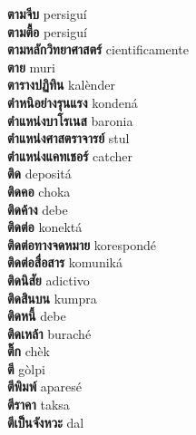 \textbf{ ตามจีบ  } persiguí \\
\textbf{ ตามตื้อ  } persiguí \\
\textbf{ ตามหลักวิทยาศาสตร์  } cientificamente \\
\textbf{ ตาย  } muri \\
\textbf{ ตารางปฏิทิน  } kalènder \\
\textbf{ ตำหนิอย่างรุนแรง  } kondená \\
\textbf{ ตำแหน่งบาโรเนส  } baronia \\
\textbf{ ตำแหน่งศาสตราจารย์  } stul \\
\textbf{ ตำแหน่งแคทเชอร์  } catcher \\
\textbf{ ติด  } depositá \\
\textbf{ ติดคอ  } choka \\
\textbf{ ติดค้าง  } debe \\
\textbf{ ติดต่อ  } konektá \\
\textbf{ ติดต่อทางจดหมาย  } korespondé \\
\textbf{ ติดต่อสื่อสาร  } komuniká \\
\textbf{ ติดนิสัย  } adictivo \\
\textbf{ ติดสินบน  } kumpra \\
\textbf{ ติดหนี้  } debe \\
\textbf{ ติดเหล้า  } buraché \\
\textbf{ ติ๊ก  } chèk \\
\textbf{ ตี  } gòlpi \\
\textbf{ ตีพิมพ์  } aparesé \\
\textbf{ ตีราคา  } taksa \\
\textbf{ ตีเป็นจังหวะ  } dal \\
